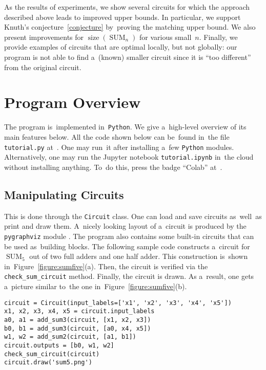 \documentclass[12pt,letterpaper]{article}
\DeclareMathOperator{\SUM}{SUM}
\DeclareMathOperator{\size}{size}
\begin{document}
As the results of experiments, we show several circuits
for which the approach described above leads to improved upper bounds. In particular, we support Knuth's conjecture~\eqref{conjecture} by~proving the matching upper bound. We also present improvements for $\size(\SUM_n)$ for various small~$n$. 
Finally, we provide examples of circuits that are
optimal locally, but not globally: our program is not able to find a~(known) smaller circuit since it is 
``too different'' from the original circuit.






\section{Program Overview}
The program is~implemented in~\texttt{Python}.
We give a~high-level overview of its main features below.
All the code shown below can be~found in~the 
file \texttt{tutorial.py} at~\cite{git-improvement}.
One may run~it after installing a~few \texttt{Python} modules. Alternatively, one may run the Jupyter notebook
\texttt{tutorial.ipynb} in~the cloud without installing 
anything. To~do this, press the badge ``Colab'' 
at~\cite{git-improvement}.

\subsection{Manipulating Circuits}
This is done through the \texttt{Circuit}
class. One can load and save circuits as~well~as
print and draw them. A~nicely looking layout of
a~circuit is produced by the \texttt{pygraphviz} module \cite{}. The program also contains some built-in
circuits that can be used as~building blocks.
The following sample code constructs a~circuit
for $\SUM_5$ out of two full adders and 
one half adder. This construction is~shown 
in~Figure~\ref{figure:sumfive}(a). Then, 
the circuit is verified via the  
\texttt{check_sum_circuit} method. 
Finally, the circuit is drawn. As a~result, one gets
a~picture similar to~the one in~Figure~\ref{figure:sumfive}(b).

\begin{verbatim}
circuit = Circuit(input_labels=['x1', 'x2', 'x3', 'x4', 'x5'])
x1, x2, x3, x4, x5 = circuit.input_labels
a0, a1 = add_sum3(circuit, [x1, x2, x3])
b0, b1 = add_sum3(circuit, [a0, x4, x5])
w1, w2 = add_sum2(circuit, [a1, b1])
circuit.outputs = [b0, w1, w2]
check_sum_circuit(circuit)
circuit.draw('sum5.png')
\end{verbatim}
\end{document}
